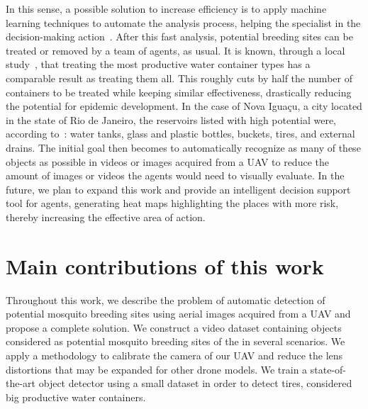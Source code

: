 In this sense, a possible solution to increase efficiency is to apply machine learning techniques to automate the analysis process, helping the specialist in the decision-making action~\cite{casfinal2018}.
After this fast analysis, potential breeding sites can be treated or removed by a team of agents, as usual.
It is known, through a local study~\cite{tun2009reducing}, that treating the most productive water container types has a comparable result as treating them all.
This roughly cuts by half the number of containers to be treated while keeping similar effectiveness, drastically reducing the potential for epidemic development.
In the case of Nova Iguaçu, a city located in the state of Rio de Janeiro, the reservoirs listed with high potential were, according to~\cite{Lagrotta2006}: water tanks, glass and plastic bottles, buckets, tires, and external drains.
The initial goal then becomes to automatically recognize as many of these objects as possible in videos or images acquired from a UAV
to reduce the amount of images or videos the agents would need to visually evaluate.
In the future, we plan to expand this work and provide an intelligent decision support tool for agents, generating heat maps highlighting the places with more risk, thereby increasing the effective area of action.

\section{Main contributions of this work}
%
Throughout this work,
we describe the problem of automatic detection of potential mosquito breeding sites using aerial images acquired from a UAV
and propose a complete solution.
%
We construct a video dataset containing objects considered as potential mosquito breeding sites of the \Aedes in several scenarios.
%
We apply a methodology to calibrate the camera of our UAV and reduce the lens distortions that may be expanded for other drone models.
%
We train a state-of-the-art object detector using a small dataset in order to detect tires, considered big productive water containers.
%

